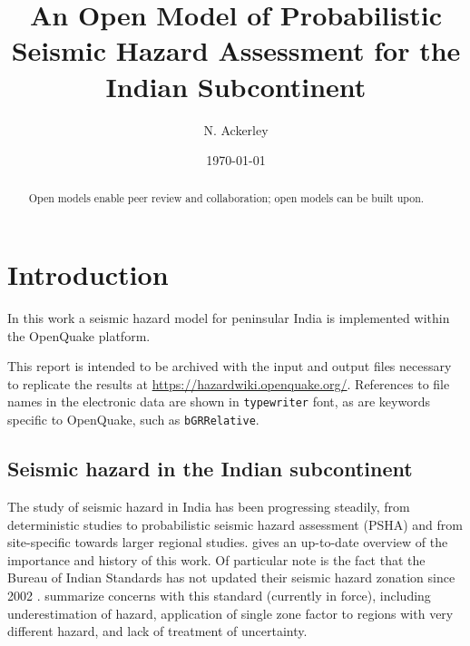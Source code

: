 \documentclass{article}
\begin{document}
\title{An Open Model of Probabilistic Seismic Hazard Assessment for the Indian Subcontinent}
\date{\today}

\setcounter{Maxaffil}{0} %
\author[1,2]{N. Ackerley}

\maketitle

\begin{abstract}
Open models enable peer review and collaboration; open models can be built upon.
\end{abstract}

\tableofcontents
\listoffigures
\listoftables

\section{Introduction}
\label{sec:Introduction}

In this work a seismic hazard model for peninsular India \cite{nath2012probabilistic} is implemented within the OpenQuake \citep{weatherill2014openquake,crowley2015openquake} platform.

This report is intended to be archived with the input and output files necessary to replicate the results at \url{https://hazardwiki.openquake.org/}.
References to file names in the electronic data are shown in \texttt{typewriter} font, as are keywords specific to OpenQuake, such as \texttt{bGRRelative}.

\subsection{Seismic hazard in the Indian subcontinent}
\label{subsec:PshaIndia}

The study of seismic hazard in India has been progressing steadily, from deterministic studies \citep{bis2002criteria} to probabilistic seismic hazard assessment (PSHA) and from site-specific towards larger regional studies.
\cite{ashish2016probabilistic} gives an up-to-date overview of the importance and history of this work.
Of particular note is the fact that the Bureau of Indian Standards has not updated their seismic hazard zonation since 2002 \citep{bis2002criteria}.
\cite{nath2012probabilistic} summarize concerns with this standard (currently in force), including underestimation of hazard, application of single zone factor to regions with very different hazard, and lack of treatment of uncertainty.
\end{document}
